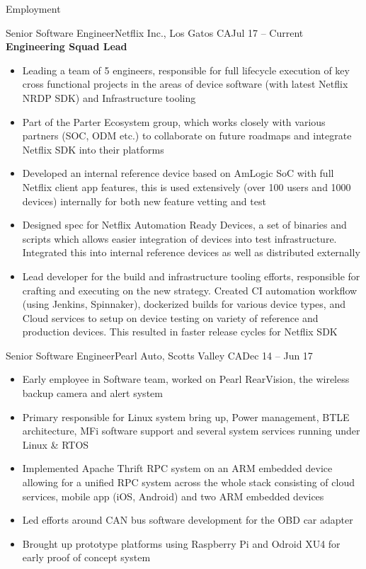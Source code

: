 \documentclass[]{mcdowellcv}
\begin{document}
	\makeheader
	
	\begin{cvsection}{Employment}
		\begin{cvsubsection}{Senior Software Engineer}{Netflix Inc., Los Gatos CA}{Jul 17 -- Current}
			\textbf{Engineering Squad Lead}
			\begin{itemize}
				\item Leading a team of 5 engineers, responsible for full lifecycle execution of key cross functional projects in the areas of device software (with latest Netflix NRDP SDK) and Infrastructure tooling 
				\item Part of the Parter Ecosystem group, which works closely with various partners (SOC, ODM etc.) to collaborate on future roadmaps and integrate Netflix SDK into their platforms 
				\item Developed an internal reference device based on AmLogic SoC with full Netflix client app features, this is used extensively (over 100 users and 1000 devices) internally for both new feature vetting and test
				\item Designed spec for Netflix Automation Ready Devices, a set of binaries and scripts which allows easier integration of devices into test infrastructure. Integrated this into internal reference devices as well as distributed externally
				\item Lead developer for the build and infrastructure tooling efforts, responsible for crafting and executing on the new strategy. Created CI automation workflow (using Jenkins, Spinnaker), dockerized builds for various device types, and Cloud services to setup on device testing on variety of reference and production devices. This resulted in faster release cycles for Netflix SDK
			\end{itemize}
		\end{cvsubsection}

		\begin{cvsubsection}{Senior Software Engineer}{Pearl Auto, Scotts Valley CA}{Dec 14 -- Jun 17}
			\begin{itemize}
				\item Early employee in Software team, worked on Pearl RearVision, the wireless backup camera and alert system
				\item Primary responsible for Linux system bring up, Power management, BTLE architecture, MFi software support and several system services running under Linux \& RTOS
				\item Implemented Apache Thrift RPC system on an ARM embedded device allowing for a unified RPC system across the whole stack consisting of cloud services, mobile app (iOS, Android) and two ARM embedded devices 
				\item Led efforts around CAN bus software development for the OBD car adapter
				\item Brought up prototype platforms using Raspberry Pi and Odroid XU4 for early proof of concept system
			\end{itemize}
		\end{cvsubsection}
		

\end{cvsection}
\end{document}
